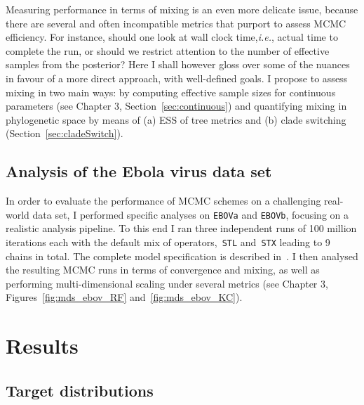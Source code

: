 Measuring performance  in terms of mixing is an even more delicate issue, because there are several and often incompatible metrics that purport to assess MCMC efficiency.
For instance, should one look at wall clock time,\textit{i.e.}, actual time to complete the run, or should we restrict attention to the number of effective samples from the posterior?
Here I shall however gloss over some of the nuances in favour of a more direct approach, with well-defined goals.
I propose to assess mixing in two main ways: by computing effective sample sizes for continuous parameters (see Chapter 3, Section~\ref{sec:continuous}) and quantifying mixing in phylogenetic space by means of (a) ESS of tree metrics and (b) clade switching (Section~\ref{sec:cladeSwitch}).

\subsection{Analysis of the Ebola virus data set}

In order to evaluate the performance of MCMC schemes on a challenging real-world data set, I performed specific analyses on \verb|EBOVa| and \verb|EBOVb|, focusing on a realistic analysis pipeline.
To this end I ran three independent runs of 100 million iterations each with the default mix of operators,~\verb|STL| and~\verb|STX| leading to 9 chains in total.
The complete model specification is described in~\cite{Dudas2017}.
I then analysed the resulting MCMC runs in terms of convergence and mixing, as well as performing multi-dimensional scaling under several metrics (see Chapter 3, Figures~\ref{fig:mds_ebov_RF} and~\ref{fig:mds_ebov_KC}).

\section{Results}

\subsection{Target distributions}
\label{sec:target}

